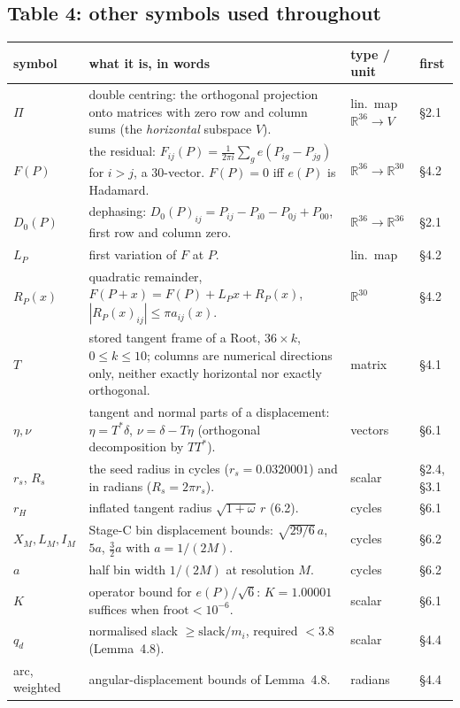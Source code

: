 \documentclass[11pt]{article}
\newcommand{\R}{\mathbb{R}}
\begin{document}
\subsection*{Table 4: other symbols used throughout}

\begin{longtable}{@{}L{1.6cm}L{5.6cm}L{2.4cm}L{1.0cm}@{}}
\hline
symbol & what it is, in words & type / unit & first \\
\hline
\endhead
$\Pi$ & double centring: the orthogonal projection onto matrices with zero row and column sums (the
  \emph{horizontal} subspace $V$). & lin.\ map $\R^{36}\to V$ & \S2.1 \\
$F(P)$ & the residual: $F_{ij}(P)=\frac{1}{2\pi i}\sum_g e(P_{ig}-P_{jg})$ for $i>j$, a 30-vector.
  $F(P)=0$ iff $e(P)$ is Hadamard. & $\R^{36}\to\R^{30}$ & \S4.2 \\
$D_0(P)$ & dephasing: $D_0(P)_{ij}=P_{ij}-P_{i0}-P_{0j}+P_{00}$, first row and column zero. & $\R^{36}\to\R^{36}$ & \S2.1 \\
$L_P$ & first variation of $F$ at $P$. & lin.\ map & \S4.2 \\
$R_P(x)$ & quadratic remainder, $F(P+x)=F(P)+L_Px+R_P(x)$, $|R_P(x)_{ij}|\le\pi a_{ij}(x)$. & $\R^{30}$ & \S4.2 \\
$T$ & stored tangent frame of a Root, $36\times k$, $0\le k\le10$; columns are numerical directions
  only, neither exactly horizontal nor exactly orthogonal. & matrix & \S4.1 \\
$\eta,\nu$ & tangent and normal parts of a displacement: $\eta=T^*\delta$, $\nu=\delta-T\eta$
  (orthogonal decomposition by $TT^*$). & vectors & \S6.1 \\
$r_s$, $R_s$ & the seed radius in cycles ($r_s=0.0320001$) and in radians ($R_s=2\pi r_s$). & scalar & \S2.4, \S3.1 \\
$r_H$ & inflated tangent radius $\sqrt{1+\omega}\,r$ (6.2). & cycles & \S6.1 \\
$X_M,L_M,I_M$ & Stage-C bin displacement bounds: $\sqrt{29/6}\,a$, $5a$, $\tfrac32 a$ with $a=1/(2M)$. & cycles & \S6.2 \\
$a$ & half bin width $1/(2M)$ at resolution $M$. & cycles & \S6.2 \\
$K$ & operator bound for $e(P)/\sqrt6$: $K=1.00001$ suffices when $\mathrm{froot}<10^{-6}$. & scalar & \S6.1 \\
$q_d$ & normalised slack $\ge \mathrm{slack}/m_i$, required $<3.8$ (Lemma~4.8). & scalar & \S4.4 \\
arc, weighted & angular-displacement bounds of Lemma~4.8. & radians & \S4.4 \\

\end{longtable}
\end{document}
